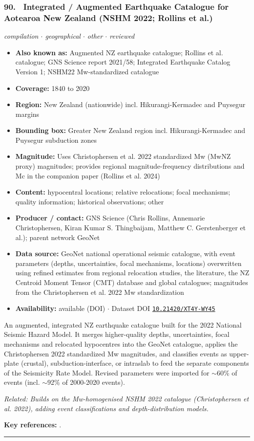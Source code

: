 \documentclass[10pt,a4paper]{article}
\newcommand{\catentryrule}{\par\vspace{3pt}\noindent\textcolor{rulegrey}{\rule{\linewidth}{0.3pt}}\par\vspace{5pt}}
\newcommand{\kv}[2]{\item \textbf{#1:} #2}
\begin{document}
\subsubsection*{\hypertarget{c:90}{90.}~ Integrated / Augmented Earthquake Catalogue for Aotearoa New Zealand (NSHM 2022; Rollins et al.)}
{\small\itshape compilation $\cdot$ geographical $\cdot$ other $\cdot$ reviewed}\par\vspace{2pt}
\begin{itemize}[leftmargin=1.3em,itemsep=0.6pt,topsep=1pt,parsep=0pt]
\kv{Also known as}{Augmented NZ earthquake catalogue; Rollins et al. catalogue; GNS Science report 2021/58; Integrated Earthquake Catalog Version 1; NSHM22 Mw-standardized catalogue}
\kv{Coverage}{1840 to 2020}
\kv{Region}{New Zealand (nationwide) incl. Hikurangi-Kermadec and Puysegur margins}
\kv{Bounding box}{Greater New Zealand region incl. Hikurangi-Kermadec and Puysegur subduction zones}
\kv{Magnitude}{Uses Christophersen et al. 2022 standardized Mw (MwNZ proxy) magnitudes; provides regional magnitude-frequency distributions and Mc in the companion paper (Rollins et al. 2024)}
\kv{Content}{hypocentral locations; relative relocations; focal mechanisms; quality information; historical observations; other}
\kv{Producer / contact}{GNS Science (Chris Rollins, Annemarie Christophersen, Kiran Kumar S. Thingbaijam, Matthew C. Gerstenberger et al.); parent network GeoNet}
\kv{Data source}{GeoNet national operational seismic catalogue, with event parameters (depths, uncertainties, focal mechanisms, locations) overwritten using refined estimates from regional relocation studies, the literature, the NZ Centroid Moment Tensor (CMT) database and global catalogues; magnitudes from the Christophersen et al. 2022 Mw standardization}
\kv{Availability}{available (DOI) $\cdot$ Dataset DOI \href{https://doi.org/10.21420/XT4Y-WY45}{\nolinkurl{10.21420/XT4Y-WY45}}}
\end{itemize}
\par\vspace{2pt}An augmented, integrated NZ earthquake catalogue built for the 2022 National Seismic Hazard Model. It merges higher-quality depths, uncertainties, focal mechanisms and relocated hypocentres into the GeoNet catalogue, applies the Christophersen 2022 standardized Mw magnitudes, and classifies events as upper-plate (crustal), subduction-interface, or intraslab to feed the separate components of the Seismicity Rate Model. Revised parameters were imported for $\sim$60\% of events (incl. $\sim$92\% of 2000-2020 events).
\par{\small\itshape Related: Builds on the Mw-homogenised NSHM 2022 catalogue (Christophersen et al. 2022), adding event classifications and depth-distribution models.}
\par\vspace{2pt}\textbf{Key references:} \cite{Rollins2022,Rollins2025,Rollins2024}.
\catentryrule
\end{document}
